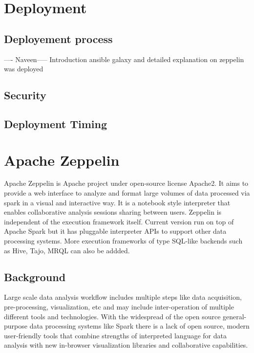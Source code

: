 \documentclass[9pt,twocolumn,twoside]{../../styles/osajnl}
\begin{document}
\section{Deployment}

\subsection{Deployement process}
---- Naveen-----
Introduction ansible galaxy and detailed explanation on zeppelin was 
deployed



\subsection{Security}


\subsection{Deployment Timing}

\section{Apache Zeppelin}

Apache Zeppelin is Apache project under open-source license Apache2. 
It aims to provide a web interface to analyze and format large 
volumes of data processed via spark in a visual and interactive way. 
It is a notebook style interpreter that enables collaborative 
analysis sessions sharing between users. Zeppelin is independent of 
the execution framework itself. Current version run on top of Apache 
Spark but it has pluggable interpreter APIs to support other data 
processing systems. More execution frameworks of type SQL-like 
backends  such as Hive, Tajo, MRQL can also be addded.

\subsection{Background}

Large scale data analysis workflow includes multiple steps like data 
acquisition, pre-processing, visualization, etc and may include 
inter-operation of multiple different tools and technologies. With 
the widespread of the open source general-purpose data processing 
systems like Spark there is a lack of open source, modern 
user-friendly tools that combine strengths of interpreted language 
for data analysis with new in-browser visualization libraries and 
collaborative capabilities.
\end{document}
